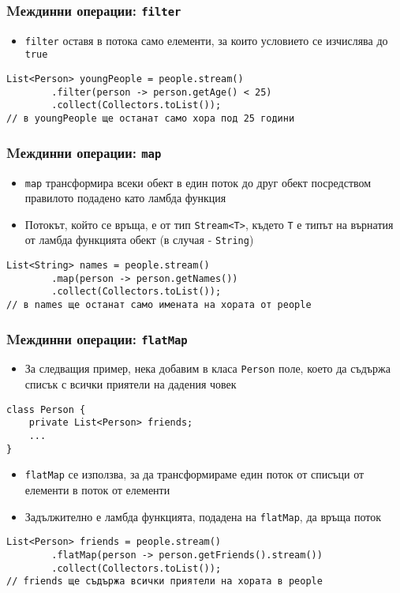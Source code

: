 \documentclass[ignorenonframetext, hyperref=unicode,compress,pdflatex]{beamer}
\begin{document}
\begin{frame}[containsverbatim]\frametitle{Mеждинни операции:
\lstinline{filter}}
\begin{itemize}
  \item \lstinline{filter} оставя в потока само елементи, за които условието се
  изчислява до \lstinline{true}
\end{itemize}
\begin{lstlisting}
List<Person> youngPeople = people.stream()
		.filter(person -> person.getAge() < 25)
		.collect(Collectors.toList());
// в youngPeople ще останат само хора под 25 години
\end{lstlisting}
\end{frame}

\begin{frame}[containsverbatim]\frametitle{Mеждинни операции:
\lstinline{map}}
\begin{itemize}
  \item \lstinline{map} трансформира всеки обект в един поток до друг обект
  посредством правилото подадено като ламбда функция
  \item Потокът, който се връща, е от тип \lstinline{Stream<T>}, където
  \lstinline{T} е типът на върнатия от ламбда функцията обект (в случая -
  \lstinline{String})
\end{itemize}
\begin{lstlisting}
List<String> names = people.stream()
		.map(person -> person.getNames())
		.collect(Collectors.toList());
// в names ще останат само имената на хората от people
\end{lstlisting}
\end{frame}

\begin{frame}[containsverbatim]\frametitle{Mеждинни операции:
\lstinline{flatMap}}
\begin{itemize}
  \item За следващия пример, нека добавим в класа \lstinline{Person} поле, което
  да съдържа списък с всички приятели на дадения човек
\end{itemize}
\begin{lstlisting}
class Person {
	private List<Person> friends;
	...
}
\end{lstlisting}
\begin{itemize}
  \item \lstinline{flatMap} се използва, за да трансформираме един поток от
  списъци от елементи в поток от елементи
  \item Задължително е ламбда функцията, подадена на \lstinline{flatMap}, да
  връща поток
\end{itemize}
\begin{lstlisting}
List<Person> friends = people.stream()
		.flatMap(person -> person.getFriends().stream())
		.collect(Collectors.toList());
// friends ще съдържа всички приятели на хората в people
\end{lstlisting}
\end{frame}
\end{document}
